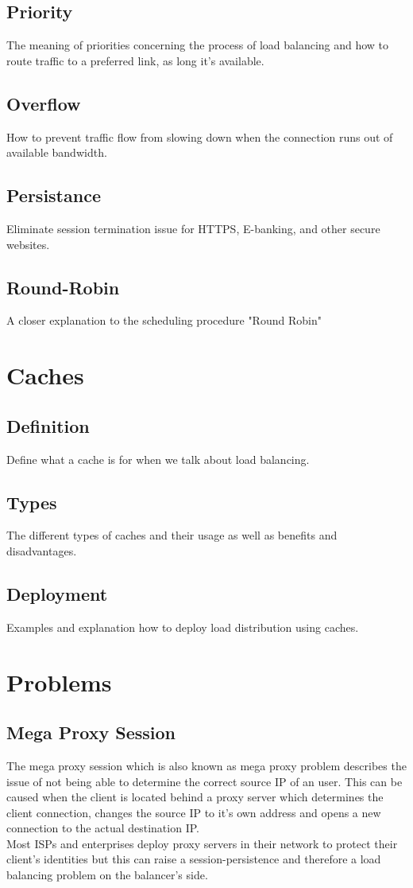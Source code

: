 \documentclass[12p]{article}
\begin{document}
	\subsection{Priority}
	The meaning of priorities concerning the process of load balancing and how to route traffic to a preferred link, as long it's available.
	\subsection{Overflow}
	How to prevent traffic flow from slowing down when the connection runs out of available bandwidth.
	\subsection{Persistance}
	Eliminate session termination issue for HTTPS, E-banking, and other secure websites.
	\subsection{Round-Robin}
	A closer explanation to the scheduling procedure "Round Robin"
	
	\newpage
	\section{Caches}
	\subsection{Definition}
	Define what a cache is for when we talk about load balancing.
	\subsection{Types}
	The different types of caches and their usage as well as benefits and disadvantages.
	\subsection{Deployment}
	Examples and explanation how to deploy load distribution using caches.
	
	\newpage
	\section{Problems}
	\subsection{Mega Proxy Session}
	The mega proxy session which is also known as mega proxy problem describes the issue of not being able to determine the correct source IP of an user. This can be caused when the client is located behind a proxy server which determines the client connection, changes the source IP to it's own address and opens a new connection to the actual destination IP.\\
	Most ISPs and enterprises deploy proxy servers in their network to protect their client's identities but this can raise a session-persistence and therefore a load balancing problem on the balancer's side.\\
	
\end{document}
